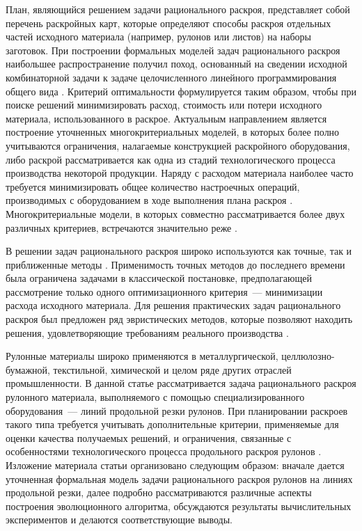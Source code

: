 \documentclass[12pt]{article}
\begin{document}
План, являющийся решением задачи рационального раскроя, представляет собой 
перечень раскройных карт, которые определяют способы раскроя отдельных частей 
исходного материала (например, рулонов или листов) на наборы заготовок. При 
построении формальных моделей задач рационального раскроя наибольшее 
распространение получил поход, основанный на сведении исходной комбинаторной 
задачи к задаче целочисленного линейного программирования общего вида 
\cite{decarvalho02}. 
Критерий оптимальности формулируется таким образом, чтобы при поиске решений 
минимизировать расход, стоимость или потери исходного материала, 
использованного в раскрое. Актуальным направлением является построение 
уточненных многокритериальных моделей, в которых более полно учитываются 
ограничения, налагаемые конструкцией раскройного оборудования, либо раскрой 
рассматривается как одна из стадий технологического процесса производства 
некоторой продукции. Наряду с расходом материала наиболее часто требуется 
минимизировать общее количество настроечных операций, производимых с 
оборудованием в ходе выполнения плана раскроя 
\cite{haessler88, foerster00}. 
Многокритериальные 
модели, в которых совместно рассматривается более двух различных критериев, 
встречаются значительно реже 
\cite{belov07}.

В решении задач рационального раскроя широко используются как точные, так и 
приближенные методы 
\cite{haessler91, golovistikov08}. 
Применимость точных методов до последнего времени 
была ограничена задачами в классической постановке, предполагающей рассмотрение 
только одного оптимизационного критерия~--- минимизации расхода исходного 
материала. Для решения практических задач рационального раскроя был предложен 
ряд эвристических методов, которые позволяют находить решения, удовлетворяющие 
требованиям реального производства 
\cite{haessler88, goulimis90, vahrenkamp96, song06, golfeto09, huang09}.

Рулонные материалы широко применяются в металлургической, целлюлозно-бумажной, 
текстильной, химической и целом ряде других отраслей промышленности. В данной 
статье рассматривается задача рационального раскроя рулонного материала, 
выполняемого с помощью специализированного оборудования~--- линий продольной 
резки рулонов. При планировании раскроев такого типа требуется учитывать 
дополнительные критерии, применяемые для оценки качества получаемых решений, и 
ограничения, связанные с особенностями технологического процесса продольного 
раскроя рулонов 
\cite{haessler88, song06}. 
Изложение материала статьи организовано следующим образом: 
вначале дается уточненная формальная модель задачи рационального раскроя 
рулонов на линиях продольной резки, далее подробно рассматриваются различные 
аспекты построения эволюционного алгоритма, обсуждаются результаты 
вычислительных экспериментов и делаются соответствующие выводы.
\end{document}
